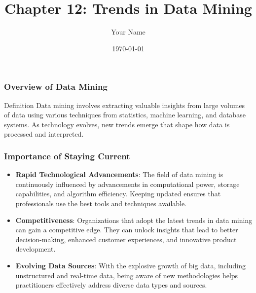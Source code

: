 \documentclass{beamer}
\title{Chapter 12: Trends in Data Mining}
\author{Your Name}
\institute{Your Institution}
\date{\today}
\begin{document}
\frame{\titlepage}

\begin{frame}[fragile]
    \titlepage
\end{frame}

\begin{frame}[fragile]
    \frametitle{Overview of Data Mining}
    \begin{block}{Definition}
        Data mining involves extracting valuable insights from large volumes of data using various techniques from statistics, machine learning, and database systems. As technology evolves, new trends emerge that shape how data is processed and interpreted.
    \end{block}
\end{frame}

\begin{frame}[fragile]
    \frametitle{Importance of Staying Current}
    \begin{itemize}
        \item \textbf{Rapid Technological Advancements}:
        The field of data mining is continuously influenced by advancements in computational power, storage capabilities, and algorithm efficiency. Keeping updated ensures that professionals use the best tools and techniques available.
        
        \item \textbf{Competitiveness}:
        Organizations that adopt the latest trends in data mining can gain a competitive edge. They can unlock insights that lead to better decision-making, enhanced customer experiences, and innovative product development.
        
        \item \textbf{Evolving Data Sources}:
        With the explosive growth of big data, including unstructured and real-time data, being aware of new methodologies helps practitioners effectively address diverse data types and sources.
    \end{itemize}
\end{frame}
\end{document}
